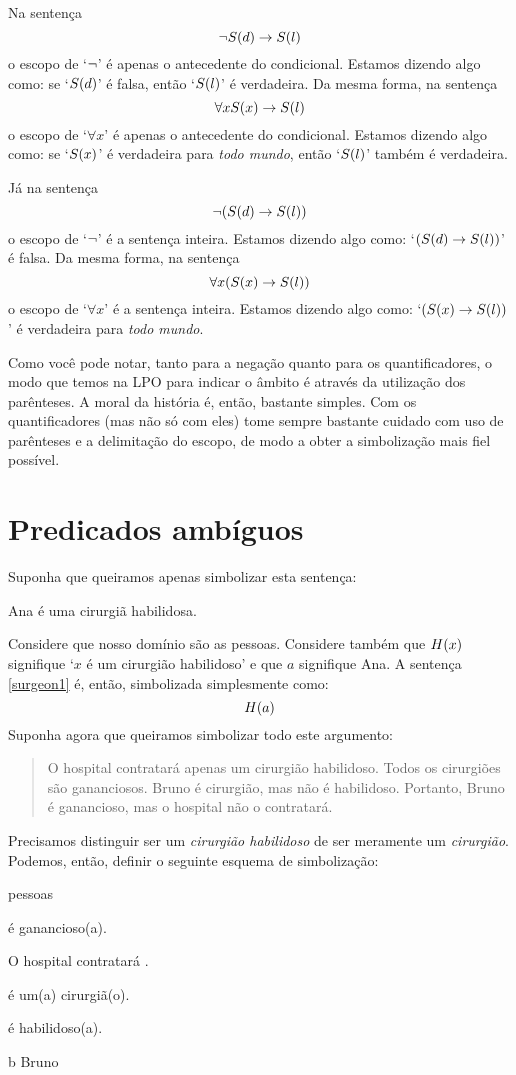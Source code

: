Na sentença
$$\neg \mathord{S}(d) \rightarrow \mathord{S}(l)$$
o escopo de `$\neg$' é apenas o antecedente do condicional. Estamos dizendo algo como: se `$\mathord{S}(d)$' é falsa, então `$\mathord{S}(l)$' é verdadeira.
Da mesma forma, na sentença
$$\forall x \mathord{S}(x) \rightarrow \mathord{S}(l)$$
o escopo de `$\forall x$' é apenas o antecedente do condicional.
Estamos dizendo algo como: se `$\mathord{S}(x)$' é verdadeira para \emph{todo mundo}, então `$\mathord{S}(l)$' também é verdadeira.

Já na sentença
$$\neg(\mathord{S}(d) \rightarrow \mathord{S}(l))$$
o escopo de `$\neg$' é a sentença inteira.
Estamos dizendo algo como: `$(\mathord{S}(d) \rightarrow \mathord{S}(l))$' é falsa.
Da mesma forma, na sentença
$$\forall x (\mathord{S}(x) \rightarrow \mathord{S}(l))$$
o escopo de `$\forall x$' é a sentença inteira.
Estamos dizendo algo como: `$(\mathord{S}(x) \rightarrow \mathord{S}(l))$' é verdadeira para \emph{todo mundo}.

Como você pode notar, tanto para a negação quanto para os quantificadores, o modo que temos na LPO para indicar o âmbito é  através da utilização dos parênteses.
A moral da história é, então, bastante simples.
Com os quantificadores (mas não só com eles) tome sempre bastante cuidado com  uso de parênteses e a delimitação do escopo, de modo a obter a simbolização mais fiel possível.


\section{Predicados ambíguos}

Suponha que queiramos apenas simbolizar esta sentença:
\begin{earg}
\item[\ex{surgeon1}] Ana é uma cirurgiã habilidosa.
\end{earg}
Considere que nosso domínio são as pessoas.
Considere também que $\mathord{H}(x)$ signifique `$x$ é um cirurgião habilidoso' e que $a$ signifique Ana.
A sentença \ref{surgeon1} é, então, simbolizada simplesmente como:
$$\mathord{H}(a)$$
Suponha agora que queiramos simbolizar todo este argumento:
\begin{quote}
O hospital contratará apenas um cirurgião habilidoso.
Todos os cirurgiões são gananciosos.
Bruno é cirurgião, mas não é habilidoso.
Portanto, Bruno é ganancioso, mas o hospital não o contratará.
\end{quote}
Precisamos distinguir ser um \emph{cirurgião habilidoso} de ser meramente um \emph{cirurgião}.
Podemos, então, definir o seguinte esquema de simbolização:
\begin{center}
\begin{ekey}
\item[\text{domínio}] pessoas
\item[\atom{G}{x}]  é ganancioso(a).
\item[\atom{T}{x}] O hospital contratará .
\item[\atom{C}{x}]  é um(a) cirurgiã(o).
\item[\atom{H}{x}]  é habilidoso(a).
\item[b] Bruno
\end{ekey}
\end{center}

